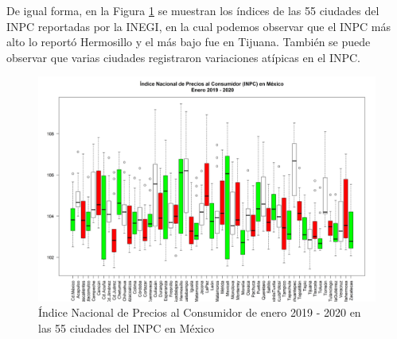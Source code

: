 \documentclass[fontsize=12pt]{article}
\begin{document}
De igual forma, en la Figura \ref{TotalCiudades} se muestran los índices de las 55 ciudades del INPC reportadas por la INEGI, en la cual podemos observar que el INPC más alto lo reportó Hermosillo y el más bajo fue en Tijuana. También se puede observar que varias ciudades registraron variaciones atípicas en el INPC.

\begin{figure}[h]
\centering
\includegraphics[scale=0.55]{TotalCiudades}
\caption{Índice Nacional de Precios al Consumidor de enero 2019 - 2020 en las 55 ciudades del INPC en México}
\label{TotalCiudades}
\end{figure}




	
	
	
	
\end{document}
